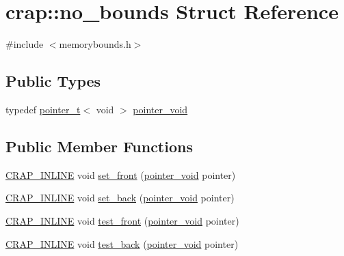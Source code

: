 \hypertarget{structcrap_1_1no__bounds}{\section{crap\+:\+:no\+\_\+bounds Struct Reference}
\label{structcrap_1_1no__bounds}
}


{\ttfamily \#include $<$memorybounds.\+h$>$}

\subsection*{Public Types}
\begin{DoxyCompactItemize}
\item 
typedef \hyperlink{structcrap_1_1pointer__t}{pointer\+\_\+t}$<$ void $>$ \hyperlink{structcrap_1_1no__bounds_a674e7cd02d3b54fe9a3690e9aa735468}{pointer\+\_\+void}
\end{DoxyCompactItemize}
\subsection*{Public Member Functions}
\begin{DoxyCompactItemize}
\item 
\hyperlink{config__x86_8h_a5a40526b8d842e7ff731509998bb0f1c}{C\+R\+A\+P\+\_\+\+I\+N\+L\+I\+N\+E} void \hyperlink{structcrap_1_1no__bounds_a2c55be64893f89ebeafcba22bbb547d8}{set\+\_\+front} (\hyperlink{structcrap_1_1no__bounds_a674e7cd02d3b54fe9a3690e9aa735468}{pointer\+\_\+void} pointer)
\item 
\hyperlink{config__x86_8h_a5a40526b8d842e7ff731509998bb0f1c}{C\+R\+A\+P\+\_\+\+I\+N\+L\+I\+N\+E} void \hyperlink{structcrap_1_1no__bounds_aa9fd7264cf915712a56806823d363c51}{set\+\_\+back} (\hyperlink{structcrap_1_1no__bounds_a674e7cd02d3b54fe9a3690e9aa735468}{pointer\+\_\+void} pointer)
\item 
\hyperlink{config__x86_8h_a5a40526b8d842e7ff731509998bb0f1c}{C\+R\+A\+P\+\_\+\+I\+N\+L\+I\+N\+E} void \hyperlink{structcrap_1_1no__bounds_a0d2d29eb3bd251024f251b73a833e9a6}{test\+\_\+front} (\hyperlink{structcrap_1_1no__bounds_a674e7cd02d3b54fe9a3690e9aa735468}{pointer\+\_\+void} pointer)
\item 
\hyperlink{config__x86_8h_a5a40526b8d842e7ff731509998bb0f1c}{C\+R\+A\+P\+\_\+\+I\+N\+L\+I\+N\+E} void \hyperlink{structcrap_1_1no__bounds_a1adaf98cdfd0a7810735393837f69906}{test\+\_\+back} (\hyperlink{structcrap_1_1no__bounds_a674e7cd02d3b54fe9a3690e9aa735468}{pointer\+\_\+void} pointer)
\end{DoxyCompactItemize}
